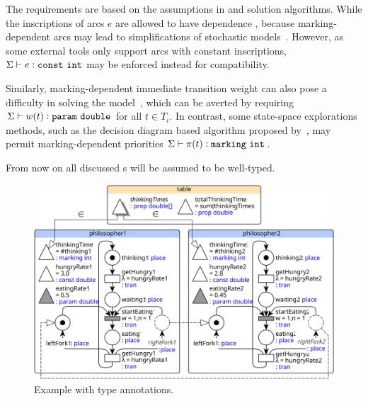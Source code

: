 \begin{remark}
  The requirements are based on the assumptions in  and  solution algorithms. While the inscriptions of arcs \(e\) are allowed to have dependence , because marking-dependent arcs may lead to simplifications of stochastic models~\citep{Ciardo93decomposition}. However, as some external tools only support arcs with constant inscriptions, \(\Sigma \vdash e \mathrel{\vcentcolon} \texttt{\upshape const}\ \texttt{\upshape int}\) may be enforced instead for compatibility.

  Similarly, marking-dependent immediate transition weight can also pose a difficulty in solving the model~\citep{Teruel03netlevel}, which can be averted by requiring \(\Sigma \vdash w(t) \mathrel{\vcentcolon} \texttt{\upshape param}\ \texttt{\upshape double}\) for all \(t \in T_i\). In contrast, some state-space explorations methods, such as the decision diagram based algorithm proposed by~\citet{Marussy17priorities}, may permit marking-dependent priorities \(\Sigma \vdash \pi(t) \mathrel{\vcentcolon} \texttt{\upshape marking}\ \texttt{\upshape int}\).
\end{remark}
  
From now on all discussed s will be assumed to be well-typed.

\begin{figure}
  \centering
  \includegraphics[scale=0.9]{figures/rgspn_example_typed}
  \caption{Example  with type annotations.}
  \label{fig:rgspn:example-typed}
\end{figure}


